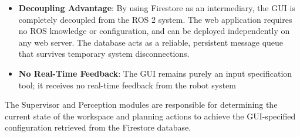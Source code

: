 \begin{itemize}
\begin{enumerate}
        \item \textbf{Assembly Allocator}:
        \begin{itemize}
            \item Subscribes to brick detections from the Perception Module (current brick positions in 3D workspace)
            \item Compares the desired arrangement (from GUI) against the available detected bricks in the current scene
            \item Validates that all required bricks are present and properly detected with sufficient confidence
            \item Performs spatial matching: associates each desired grid position with a detected brick instance
            \item Upon successful validation, generates an assembly plan containing:
            \begin{itemize}
                \item For each brick: current 3D position (XYZ) acquired from detection
                \item For each brick: desired 3D position (XYZ) computed from GUI specification
                \item Brick type and required rotation
            \end{itemize}
        \end{itemize}
    \end{enumerate}
    
    The assembly plan is published to the Supervisor, which then coordinates robot execution to move each brick from its current detected position to the desired position.
    
    
    \item \textbf{Decoupling Advantage}: By using Firestore as an intermediary, the GUI is completely decoupled from the ROS 2 system. The web application requires no ROS knowledge or configuration, and can be deployed independently on any web server. The database acts as a reliable, persistent message queue that survives temporary system disconnections.
    
    \item \textbf{No Real-Time Feedback}: The GUI remains purely an input specification tool; it receives no real-time feedback from the robot system
\end{itemize}

The Supervisor and Perception modules are responsible for determining the current state of the workspace and planning actions to achieve the GUI-specified configuration retrieved from the Firestore database.

